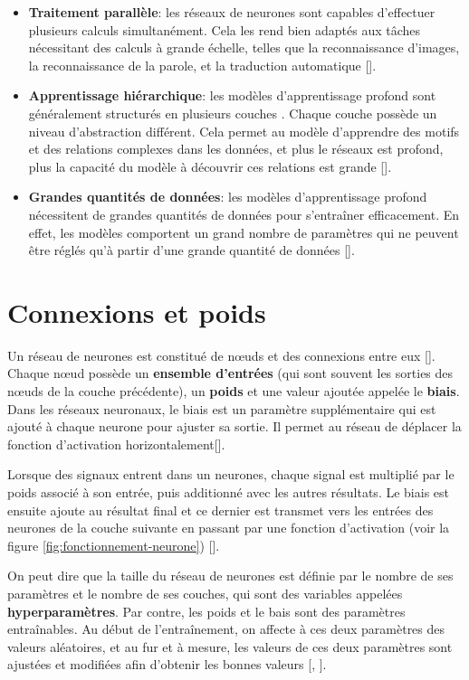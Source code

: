 \begin{itemize}
	\item \textbf{Traitement parallèle}: les réseaux de neurones sont capables d'effectuer plusieurs calculs simultanément. Cela les rend bien adaptés aux tâches nécessitant des calculs à grande échelle, telles que la reconnaissance d'images, la reconnaissance de la parole, et la traduction automatique [\cite{Goodfellow-et-al-2016}].
	\item \textbf{Apprentissage hiérarchique}: les modèles d'apprentissage profond sont généralement structurés en plusieurs couches . Chaque couche possède un niveau d'abstraction différent. Cela permet au modèle d'apprendre des motifs et des relations complexes dans les données, et plus le réseaux est profond, plus la capacité du modèle à découvrir ces relations est grande [\cite{Goodfellow-et-al-2016}].
	\item \textbf{Grandes quantités de données}: les modèles d'apprentissage profond nécessitent de grandes quantités de données pour s'entraîner efficacement. En effet, les modèles comportent un grand nombre de paramètres qui ne peuvent être réglés qu'à partir d'une grande quantité de données [\cite{Goodfellow-et-al-2016}].
\end{itemize}

\section{Connexions et poids}

Un réseau de neurones est constitué de nœuds et des connexions entre eux
	[\cite{aggarwal_2018}]. Chaque nœud possède un \textbf{ensemble d’entrées} (qui
sont souvent les sorties des nœuds de la couche précédente), un \textbf{poids}
et une valeur ajoutée appelée le \textbf{biais}. Dans les réseaux neuronaux, le
biais est un paramètre supplémentaire qui est ajouté à chaque neurone pour
ajuster sa sortie. Il permet au réseau de déplacer la fonction d'activation
horizontalement[\cite{Goodfellow-et-al-2016}].

\medskip
Lorsque des signaux entrent dans un neurones, chaque signal est multiplié par le poids associé à son entrée, puis additionné avec les autres résultats. Le biais est ensuite ajoute au résultat final et ce dernier est transmet vers les entrées des neurones de la couche suivante en passant par une fonction d'activation (voir la figure \ref{fig:fonctionnement-neurone}) [\cite{mcculloch_pitts_1943_nervous_activity}].

\medskip
On peut dire que la taille du réseau de neurones est définie par le nombre de ses paramètres et le nombre de ses couches, qui sont des variables appelées \textbf{hyperparamètres}. Par contre, les poids et le bais sont des paramètres entraînables. Au début de l'entraînement, on affecte à ces deux paramètres des valeurs aléatoires, et au fur et à mesure, les valeurs de ces deux paramètres sont ajustées et modifiées afin d'obtenir les bonnes valeurs [\cite{aggarwal_2018}, \cite{Goodfellow-et-al-2016}].

